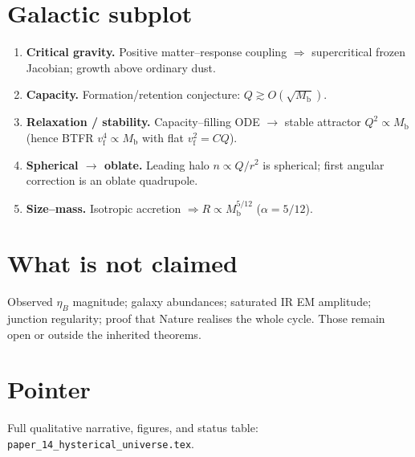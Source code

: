\documentclass[11pt]{article}
\newcommand{\Mb}{M_{\mathrm{b}}}
\newcommand{\vf}{v_{\mathrm{f}}}
\begin{document}
\section{Galactic subplot}
\begin{enumerate}
\item \textbf{Critical gravity.} Positive matter--response coupling $\Rightarrow$
  supercritical frozen Jacobian; growth above ordinary dust.
\item \textbf{Capacity.} Formation/retention conjecture:
  $Q\gtrsim O(\sqrt{\Mb})$.
\item \textbf{Relaxation / stability.} Capacity--filling ODE $\to$ stable attractor
  $Q^{2}\propto\Mb$ (hence BTFR $\vf^{4}\propto\Mb$ with flat $\vf^{2}=CQ$).
\item \textbf{Spherical $\to$ oblate.} Leading halo $n\propto Q/r^{2}$ is spherical;
  first angular correction is an oblate quadrupole.
\item \textbf{Size--mass.} Isotropic accretion $\Rightarrow R\propto\Mb^{5/12}$
  ($\alpha=5/12$).
\end{enumerate}

\section{What is not claimed}
Observed $\eta_B$ magnitude; galaxy abundances; saturated IR EM amplitude;
junction regularity; proof that Nature realises the whole cycle.
Those remain open or outside the inherited theorems.

\section{Pointer}
Full qualitative narrative, figures, and status table:
\texttt{paper\_14\_hysterical\_universe.tex}.
\end{document}
